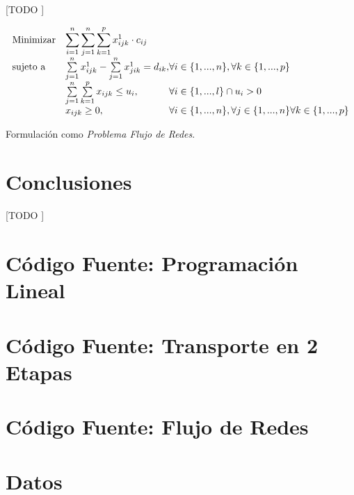 \documentclass{article}
\begin{document}
    \paragraph{}
    [TODO ]


    \begin{eqfloat}
      \begin{equation}
        \begin{array}{ll@{}ll}
          \text{Minimizar}	& \displaystyle \sum\limits_{i=1}^{n}\sum\limits_{j=1}^{n}\sum\limits_{k=1}^{p} x^{1}_{ijk} \cdot c_{ij} \\
          \text{sujeto a}		& \sum\limits_{j=1}^{n} x^{1}_{ijk} - \sum\limits_{j=1}^{n} x^{1}_{jik} = d_{ik}, & \forall i \in \{1,...,n\}, \forall k \in \{1,...,p\}\\
                            &	\sum\limits_{j=1}^{n}\sum\limits_{k=1}^{p}  x_{ijk}	\leq u_{i}, 		  & \forall i \in \{1,...,l\} \cap u_{i} > 0\\
                            & x_{ijk}	\geq 0, 	& \forall i \in \{1,...,n\}, \forall j \in \{1,...,n\}\forall k \in \{1,...,p\}
        \end{array}
      \end{equation}
      \caption{Formulación como \emph{Problema Flujo de Redes}.}
      \label{eq:linear-programming-model}
    \end{eqfloat}


  \section{Conclusiones}

    \paragraph{}
    [TODO ]

  \begin{appendices}

    \section{Código Fuente: Programación Lineal}
      

    \section{Código Fuente: Transporte en 2 Etapas}
      

    \section{Código Fuente: Flujo de Redes}
      

    \section{Datos}
      

  \end{appendices}
\end{document}
